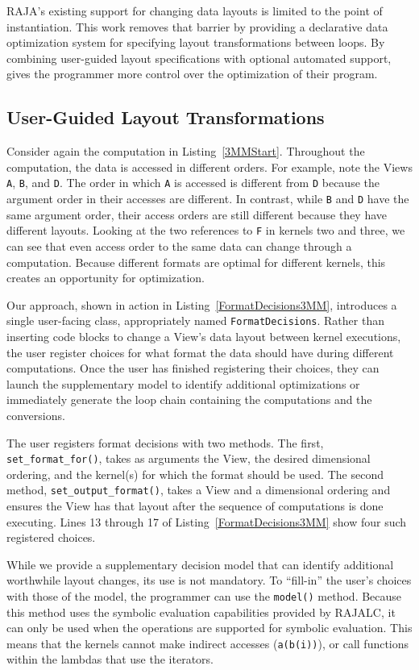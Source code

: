 RAJA's existing support for changing data layouts is limited to the point of instantiation.
This work removes that barrier by providing a declarative data optimization system for specifying layout transformations between loops.
By combining user-guided layout specifications with optional automated support, \FormatDecisions{} gives the programmer more control over the optimization of their program.

\subsection{User-Guided Layout Transformations}

Consider again the computation in Listing~\ref{3MMStart}.
Throughout the computation, the data is accessed in different orders.
For example, note the Views \verb.A., \verb.B., and \verb.D..
The order in which \verb.A. is accessed is different from \verb.D. because the argument order in their accesses are different.
In contrast, while \verb.B. and \verb.D. have the same argument order, their access orders are still different because they have different layouts.
Looking at the two references to \verb.F. in kernels two and three, we can see that even access order to the same data can change through a computation.
Because different formats are optimal for different kernels, this creates an opportunity for optimization. 

Our approach, shown in action in Listing~\ref{FormatDecisions3MM}, introduces a single user-facing class, appropriately named \verb.FormatDecisions..
Rather than inserting code blocks to change a View's data layout between kernel executions, the user register choices for what format the data should have during different computations. 
Once the user has finished registering their choices, they can launch the supplementary model to identify additional optimizations or immediately generate the loop chain containing the computations and the conversions.

The user registers format decisions with two methods.
The first, \verb.set_format_for()., takes as arguments the View, the desired dimensional ordering, and the kernel(s) for which the format should be used.
The second method, \verb.set_output_format()., takes a View and a dimensional ordering and ensures the View has that layout after the sequence of computations is done executing.
Lines 13 through 17 of Listing~\ref{FormatDecisions3MM} show four such registered choices.


While we provide a supplementary decision model that can identify additional worthwhile layout changes, its use is not mandatory.
To ``fill-in'' the user's choices with those of the model, the programmer can use the \verb.model(). method.
Because this method uses the symbolic evaluation capabilities provided by RAJALC, it can only be used when the operations are supported for symbolic evaluation.
This means that the kernels cannot make indirect accesses (\verb.a(b(i)).), or call functions within the lambdas that use the iterators.

